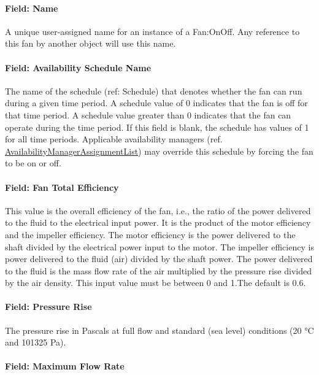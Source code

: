 \paragraph{Field: Name}\label{field-name-1-016}

A unique user-assigned name for an instance of a Fan:OnOff. Any reference to this fan by another object will use this name.

\paragraph{Field: Availability Schedule Name}\label{field-availability-schedule-name-1-005}

The name of the schedule (ref: Schedule) that denotes whether the fan can run during a given time period. A schedule value of 0 indicates that the fan is off for that time period. A schedule value greater than 0 indicates that the fan can operate during the time period. If this field is blank, the schedule has values of 1 for all time periods. Applicable availability managers (ref. \hyperref[availabilitymanagerassignmentlist]{AvailabilityManagerAssignmentList}) may override this schedule by forcing the fan to be on or off.

\paragraph{Field: Fan Total Efficiency}\label{field-fan-total-efficiency-1-000}

This value is the overall efficiency of the fan, i.e., the ratio of the power delivered to the fluid to the electrical input power. It is the product of the motor efficiency and the impeller efficiency. The motor efficiency is the power delivered to the shaft divided by the electrical power input to the motor. The impeller efficiency is power delivered to the fluid (air) divided by the shaft power. The power delivered to the fluid is the mass flow rate of the air multiplied by the pressure rise divided by the air density. This input value must be between 0 and 1.The default is 0.6.

\paragraph{Field: Pressure Rise}\label{field-pressure-rise-1}

The pressure rise in Pascals at full flow and standard (sea level) conditions (20 °C and 101325 Pa).

\paragraph{Field: Maximum Flow Rate}\label{field-maximum-flow-rate-1}

